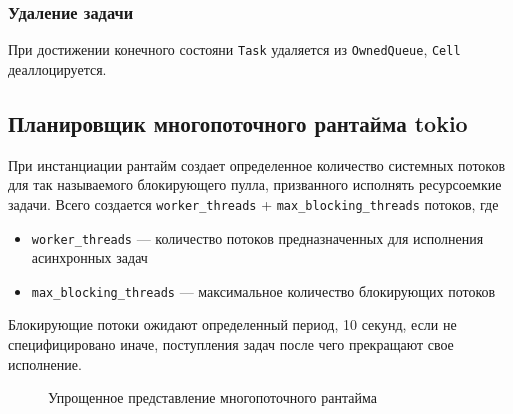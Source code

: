 \subsubsection{Удаление задачи}

При достижении конечного состояни \verb|Task| удаляется из \verb|OwnedQueue|, \verb|Cell| деаллоцируется.

\subsection{Планировщик многопоточного рантайма tokio}

При инстанциации рантайм создает определенное количество системных потоков для так называемого блокирующего пулла, призванного исполнять ресурсоемкие задачи. Всего создается \verb|worker_threads| + \verb|max_blocking_threads| потоков, где

\begin{itemize}
    \item \verb|worker_threads| --- количество потоков предназначенных для исполнения асинхронных задач
    \item \verb|max_blocking_threads| --- максимальное количество блокирующих потоков
\end{itemize}

Блокирующие потоки ожидают определенный период, 10 секунд, если не специфицировано иначе, поступления задач после чего прекращают свое исполнение.

\begin{figure}[H]
    \begin{center}
    \end{center}

    \caption{Упрощенное представление многопоточного рантайма}
    \label{fig:tokio:arch}
\end{figure}

